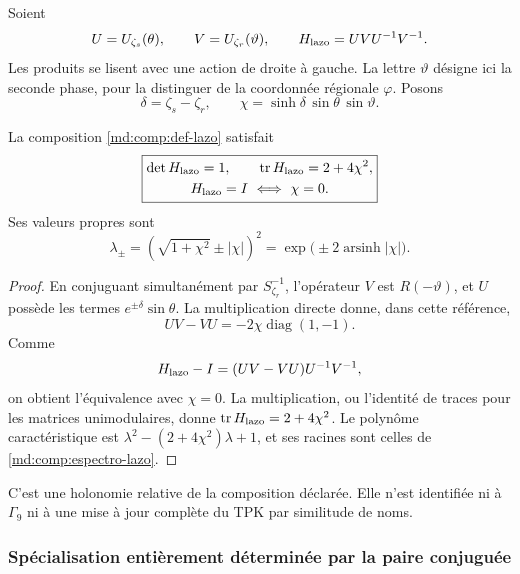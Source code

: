 Soient
\begin{equation}
 U=U_{\zeta_s}(\theta),\qquad
 V=U_{\zeta_r}(\vartheta),\qquad
 H_{\rm lazo}=UVU^{-1}V^{-1}.
 \label{md:comp:def-lazo}
\end{equation}
Les produits se lisent avec une action de droite à gauche.
La lettre \(\vartheta\) désigne ici la seconde phase, pour la distinguer
de la coordonnée régionale \(\varphi\). Posons
\[
 \delta=\zeta_s-\zeta_r,\qquad
 \chi=\sinh\delta\,\sin\theta\,\sin\vartheta.
\]

\begin{proposition}
\label{md:comp:prop-lazo}
La composition \eqref{md:comp:def-lazo} satisfait
\begin{equation}
 \boxed{\begin{gathered}
 \det H_{\rm lazo}=1,\qquad
 \operatorname{tr}H_{\rm lazo}=2+4\chi^2,\\
 H_{\rm lazo}=I\ \Longleftrightarrow\ \chi=0.
 \end{gathered}}
 \label{md:comp:traza-lazo}
\end{equation}
Ses valeurs propres sont
\begin{equation}
 \lambda_\pm=(\sqrt{1+\chi^2}\pm|\chi|)^2
 =\exp\bigl(\pm2\operatorname{arsinh}|\chi|\bigr).
 \label{md:comp:espectro-lazo}
\end{equation}
\end{proposition}
\begin{proof}
En conjuguant simultanément par \(S_{\zeta_r}^{-1}\), l’opérateur \(V\)
est \(R(-\vartheta)\), et \(U\) possède les termes
\(e^{\pm\delta}\sin\theta\). La multiplication directe donne, dans cette
référence,
\[
 UV-VU=-2\chi\operatorname{diag}(1,-1).
\]
Comme
\[
 H_{\rm lazo}-I=(UV-VU)U^{-1}V^{-1},
\]
on obtient l’équivalence avec \(\chi=0\). La multiplication, ou
l’identité de traces pour les matrices unimodulaires, donne
\(\operatorname{tr}H_{\rm lazo}=2+4\chi^2\).
Le polynôme caractéristique est
\(\lambda^2-(2+4\chi^2)\lambda+1\), et ses racines sont celles de
\eqref{md:comp:espectro-lazo}.
\end{proof}

C’est une holonomie relative de la composition déclarée.
Elle n’est identifiée ni à \(\Gamma_9\) ni à une mise à jour complète
du TPK par similitude de noms.

\subsubsection{Spécialisation entièrement déterminée par la paire conjuguée}
\label{md:comp:lazo-conjugado}

